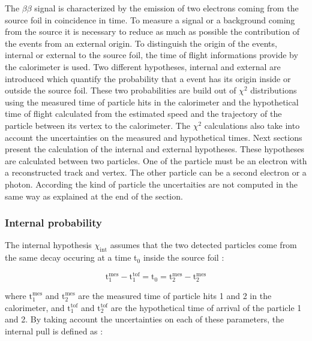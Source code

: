 \documentclass[main.tex]{subfiles}
\begin{document}
\NI The $\beta\beta$ signal is characterized by the emission of two electrons coming from the source foil in coincidence in time. To measure a signal or a background coming from the source it is necessary to reduce as much as possible the contribution of the events from an external origin. To distinguish the origin of the events, internal or external to the source foil, the time of flight informations provide by the calorimeter is used. Two different hypotheses, internal and external are introduced which quantify the probability that a event has its origin inside or outside the source foil. These two probabilities are build out of $\chi^\text{2}$ distributions using the measured time of particle hits in the calorimeter and the hypothetical time of flight calculated from the estimated speed and the trajectory of the particle between its vertex to the calorimeter. The $\chi^\text{2}$ calculations also take into account the uncertainties on the measured and hypothetical times. Next sections present the calculation of the internal and external hypotheses. These hypotheses are calculated between two particles. One of the particle must be an electron with a reconstructed track and vertex.  The other particle can be a second electron or a photon. According the kind of particle the uncertaities are not computed in the same way as explained at the end of the section.


\subsubsection{Internal probability}\label{sec:Pint}


\NI The internal hypothesis $\chi_{\text{int}}$ assumes that the two detected particles come from the same decay occuring at a time t$_\text{0}$ inside the source foil :


\begin{equation}
\text{t}_\text{1}^{\text{mes}} - \text{t}_\text{1}^{\text{tof}} = \text{t}_\text{0} = \text{t}_\text{2}^{\text{mes}} - \text{t}_\text{2}^{\text{mes}}  
\end{equation}


\NI where $\text{t}_\text{1}^{\text{mes}}$ and $\text{t}_\text{2}^{\text{mes}}$ are the measured time of particle hits 1 and 2 in the calorimeter, and $\text{t}_\text{1}^{\text{tof}}$ and $\text{t}_\text{2}^{\text{tof}}$ are the hypothetical time of arrival of the particle 1 and 2. By taking account the uncertainties on each of these parameters, the internal pull is defined as :
\end{document}
